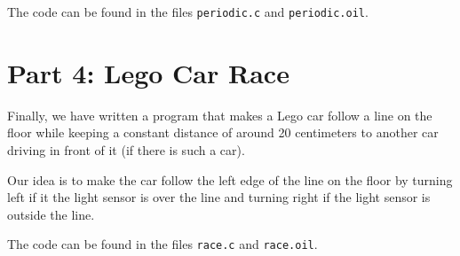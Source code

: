 \documentclass[a4paper,11pt]{article}
\begin{document}
The code can be found in the files \texttt{periodic.c} and \texttt{periodic.oil}.

\section*{Part 4: Lego Car Race}
Finally, we have written a program that makes a Lego car follow a line on the floor while keeping a constant distance of around 20 centimeters to another car driving in front of it (if there is such a car).

Our idea is to make the car follow the left edge of the line on the floor by turning left if it the light sensor is over the line and turning right if the light sensor is outside the line.

The code can be found in the files \texttt{race.c} and \texttt{race.oil}.
\end{document}
